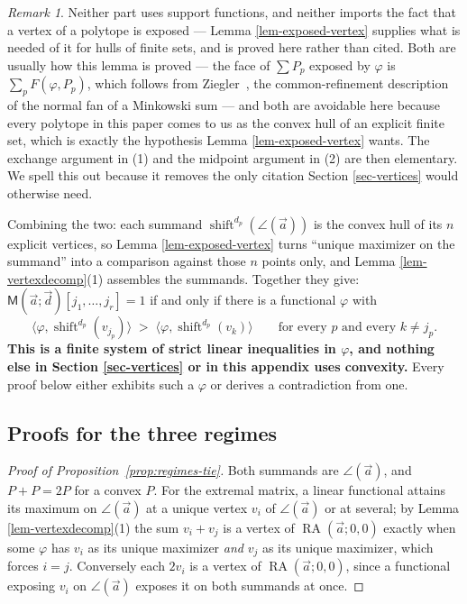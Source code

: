 \documentclass[11pt, a4paper, abstract=yes]{scrartcl}
\theoremstyle{definition}
\theoremstyle{remark}
\newtheorem{remark}[definition]{Remark}
\theoremstyle{plain}
\newcommand{\shift}{\operatorname{shift}}
\newcommand{\rasimp}{\angle}
\newcommand{\RA}{\operatorname{RA}}
\newcommand{\extten}{\mathsf{M}}
\begin{document}
\begin{remark}
Neither part uses support functions, and neither imports the fact that a vertex of a polytope is
exposed --- Lemma \ref{lem-exposed-vertex} supplies what is needed of it for hulls of finite sets, and
is proved here rather than cited. Both are usually how this lemma is proved --- the face of \(\sum P_p\) exposed by
\(\varphi\) is \(\sum_pF(\varphi,P_p)\), which follows from Ziegler~\cite[Proposition 7.12]{Ziegler1995},
the common-refinement description of the normal fan of a Minkowski sum --- and both
are avoidable here because every polytope in this paper comes to us as the convex hull of an
explicit finite set, which is exactly the hypothesis Lemma \ref{lem-exposed-vertex} wants. The
exchange argument in (1) and the midpoint argument in (2) are then elementary. We spell this out
because it removes the only citation Section \ref{sec-vertices} would otherwise need.
\label{rem-no-support-functions}
\end{remark}

Combining the two: each summand \(\shift^{d_p}(\rasimp(\vec a))\) is the convex hull of its \(n\)
explicit vertices, so Lemma \ref{lem-exposed-vertex} turns ``unique maximizer on the summand'' into a
comparison against those \(n\) points only, and Lemma \ref{lem-vertexdecomp}(1) assembles the summands.
Together they give: \(\extten(\vec a;\vec d)[j_1,\dots,j_r]=1\) if and only if there is a
functional \(\varphi\) with
\begin{equation}\label{eq:no-support-functions}
  \bigl\langle\varphi,\shift^{d_p}(v_{j_p})\bigr\rangle
  \;>\;\bigl\langle\varphi,\shift^{d_p}(v_{k})\bigr\rangle
  \qquad\text{for every }p\text{ and every }k\ne j_p .
\end{equation}
\textbf{This is a finite system of strict linear inequalities in \(\varphi\), and nothing else in
Section \ref{sec-vertices} or in this appendix uses convexity.} Every proof below either exhibits
such a \(\varphi\) or derives a
contradiction from one.
\subsection{Proofs for the three regimes}
\label{sec-app-regimes}
\begin{proof}[Proof of Proposition~\ref{prop:regimes-tie}]
Both summands are \(\rasimp(\vec a)\), and \(P+P=2P\) for a convex \(P\). For the extremal matrix,
a linear functional attains its maximum on \(\rasimp(\vec a)\) at a unique vertex \(v_i\) of
\(\rasimp(\vec a)\) or at
several; by Lemma \ref{lem-vertexdecomp}(1) the sum \(v_i+v_j\) is a vertex of \(\RA(\vec a;0,0)\)
exactly when some \(\varphi\)
has \(v_i\) as its unique maximizer \emph{and} \(v_j\) as its unique maximizer, which forces \(i=j\).
Conversely each \(2v_i\) is a vertex of \(\RA(\vec a;0,0)\), since a functional exposing \(v_i\) on
\(\rasimp(\vec a)\) exposes it on both summands at once.
\end{proof}
\end{document}
